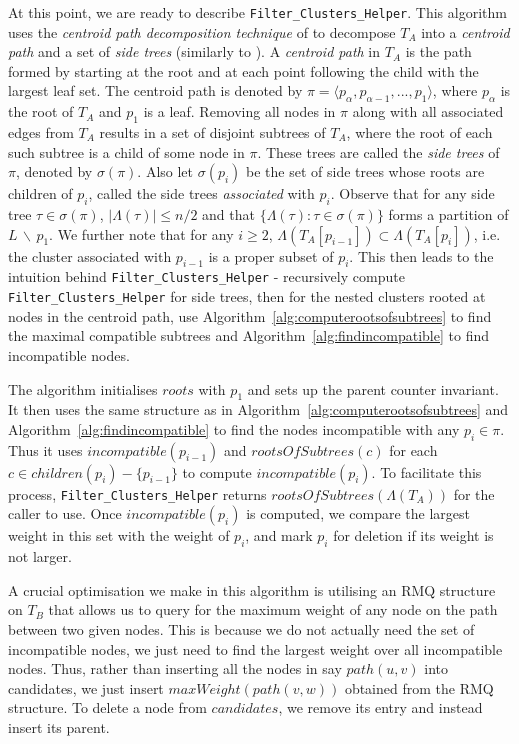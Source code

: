 \documentclass{article}
\newcommand{\leafset}{\Lambda}
\begin{document}
    At this point, we are ready to describe \texttt{Filter\_Clusters\_Helper}. This algorithm uses the \textit{centroid path decomposition technique} of \cite{cole2000n} to decompose $T_A$ into a \textit{centroid path} and a set of \textit{side trees} (similarly to \cite{jansson2018algorithms}). A \textit{centroid path} in $T_A$ is the path formed by starting at the root and at each point following the child with the largest leaf set. The centroid path is denoted by $\pi = \langle p_{\alpha}, p_{\alpha - 1}, ..., p_1 \rangle$, where $p_{\alpha}$ is the root of $T_A$ and $p_1$ is a leaf. Removing all nodes in $\pi$ along with all associated edges from $T_A$ results in a set of disjoint subtrees of $T_A$, where the root of each such subtree is a child of some node in $\pi$. These trees are called the \textit{side trees} of $\pi$, denoted by $\sigma(\pi)$. Also let $\sigma(p_i)$ be the set of side trees whose roots are children of $p_i$, called the side trees \textit{associated} with $p_i$. Observe that for any side tree $\tau \in \sigma(\pi)$, $|\leafset(\tau)| \leq n/2$ and that $\{\leafset(\tau) : \tau \in \sigma(\pi)\}$ forms a partition of $L\, \backslash\, {p_1}$. We further note that for any $i \geq 2$, $\leafset(T_A[p_{i - 1}]) \subset \leafset(T_A[p_i])$, i.e. the cluster associated with $p_{i-1}$ is a proper subset of $p_i$. This then leads to the intuition behind \texttt{Filter\_Clusters\_Helper} - recursively compute \texttt{Filter\_Clusters\_Helper} for side trees, then for the nested clusters rooted at nodes in the centroid path, use Algorithm~\ref{alg:computerootsofsubtrees} to find the maximal compatible subtrees and Algorithm~\ref{alg:findincompatible} to find incompatible nodes.

    The algorithm initialises $roots$ with $p_1$ and sets up the parent counter invariant. It then uses the same structure as in Algorithm~\ref{alg:computerootsofsubtrees} and Algorithm~\ref{alg:findincompatible} to find the nodes incompatible with any $p_i \in \pi$. Thus it uses $incompatible(p_{i-1})$ and $rootsOfSubtrees(c)$ for each $c \in children(p_i) - \{p_{i-1}\}$ to compute $incompatible(p_i)$. To facilitate this process, \texttt{Filter\_Clusters\_Helper} returns $rootsOfSubtrees(\leafset(T_A))$ for the caller to use. Once $incompatible(p_i)$ is computed, we compare the largest weight in this set with the weight of $p_i$, and mark $p_i$ for deletion if its weight is not larger.

    A crucial optimisation we make in this algorithm is utilising an RMQ structure on $T_B$ that allows us to query for the maximum weight of any node on the path between two given nodes. This is because we do not actually need the set of incompatible nodes, we just need to find the largest weight over all incompatible nodes. Thus, rather than inserting all the nodes in say $path(u, v)$ into candidates, we just insert $maxWeight(path(v, w))$ obtained from the RMQ structure. To delete a node from $candidates$, we remove its entry and instead insert its parent.
\end{document}
